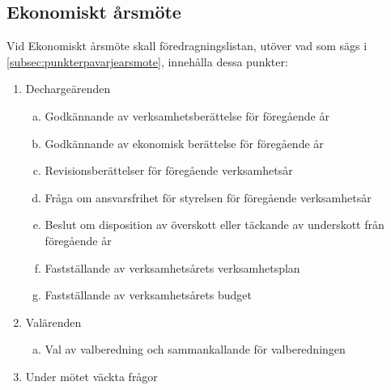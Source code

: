         \subsection{Ekonomiskt årsmöte}
        \label{subsec:ekonomisktarsmote}
                Vid Ekonomiskt årsmöte skall föredragningslistan, utöver vad som sägs i \ref{subsec:punkterpavarjearsmote}, innehålla dessa punkter:
                \begin{enumerate}[1.]
                \setlength{\itemsep}{0.0cm}
                \setlength{\parskip}{0.0cm}
                \setcounter{enumi}{3}
                        \item Dechargeärenden
                        \begin{enumerate}[a.]
                        \setlength{\itemsep}{0.0cm}
                        \setlength{\parskip}{0.0cm}
                                \item Godkännande av verksamhetsberättelse för föregående år
                                \item Godkännande av ekonomisk berättelse för föregående år
                                \item Revisionsberättelser för föregående verksamhetsår
                                \item Fråga om ansvarsfrihet för styrelsen för föregående verksamhetsår
                                \item Beslut om disposition av överskott eller täckande av underskott från föregående år
                                \item Fastställande av verksamhetsårets verksamhetsplan
                                \item Fastställande av verksamhetsårets budget
                                \end{enumerate}
                        \item Valärenden
                        \begin{enumerate}[a.]
                        \setlength{\itemsep}{0.0cm}
                        \setlength{\parskip}{0.0cm}
                                \item Val av valberedning och sammankallande för valberedningen
                                \end{enumerate}
                \setcounter{enumi}{5}
                        \item Under mötet väckta frågor
                        \end{enumerate}


